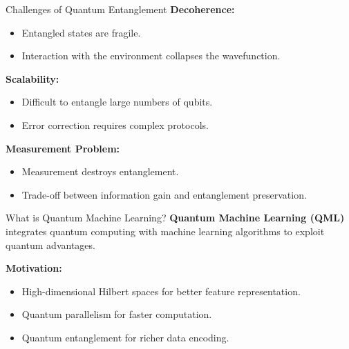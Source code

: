 \documentclass{beamer}
\begin{document}
\begin{frame}{Challenges of Quantum Entanglement}
\textbf{Decoherence:}
\begin{itemize}
    \item Entangled states are fragile.
    \item Interaction with the environment collapses the wavefunction.
\end{itemize}

\textbf{Scalability:}
\begin{itemize}
    \item Difficult to entangle large numbers of qubits.
    \item Error correction requires complex protocols.
\end{itemize}

\textbf{Measurement Problem:}
\begin{itemize}
    \item Measurement destroys entanglement.
    \item Trade-off between information gain and entanglement preservation.
\end{itemize}
\end{frame}

\begin{frame}{What is Quantum Machine Learning?}
\textbf{Quantum Machine Learning (QML)} integrates quantum computing with machine learning algorithms to exploit quantum advantages.

\vspace{10pt}
\textbf{Motivation:}
\begin{itemize}
    \item High-dimensional Hilbert spaces for better feature representation.
    \item Quantum parallelism for faster computation.
    \item Quantum entanglement for richer data encoding.
\end{itemize}


\end{frame}
\end{document}
